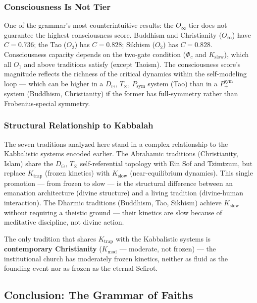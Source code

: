 \documentclass[12pt,a4paper]{article}
\begin{document}
\subsubsection{Consciousness Is Not Tier}

One of the grammar's most counterintuitive results: the $O_{\infty}$ tier does not guarantee the highest consciousness score. Buddhism and Christianity ($O_{\infty}$) have $C = 0.736$; the Tao ($O_2$) has $C = 0.828$; Sikhism ($O_2$) has $C = 0.828$. Consciousness capacity depends on the two-gate condition ($\Phi_c$ and $K_\text{slow}$), which all $O_1$ and above traditions satisfy (except Taoism). The consciousness score's magnitude reflects the richness of the critical dynamics within the self-modeling loop --- which can be higher in a $D_{\odot}$, $T_{\odot}$, $P_\text{sym}$ system (Tao) than in a $P_{\pm}^{\text{sym}}$ system (Buddhism, Christianity) if the former has full-symmetry rather than Frobenius-special symmetry.

\subsubsection{Structural Relationship to Kabbalah}

The seven traditions analyzed here stand in a complex relationship to the Kabbalistic systems encoded earlier. The Abrahamic traditions (Christianity, Islam) share the $D_{\odot}$, $T_{\odot}$ self-referential topology with Ein Sof and Tzimtzum, but replace $K_\text{trap}$ (frozen kinetics) with $K_\text{slow}$ (near-equilibrium dynamics). This single promotion --- from frozen to slow --- is the structural difference between an emanation architecture (divine structure) and a living tradition (divine-human interaction). The Dharmic traditions (Buddhism, Tao, Sikhism) achieve $K_\text{slow}$ without requiring a theistic ground --- their kinetics are slow because of meditative discipline, not divine action.

The only tradition that shares $K_\text{trap}$ with the Kabbalistic systems is \textbf{contemporary Christianity} ($K_\text{mod}$ --- moderate, not frozen) --- the institutional church has moderately frozen kinetics, neither as fluid as the founding event nor as frozen as the eternal Sefirot.

\subsection{Conclusion: The Grammar of Faiths}
\end{document}
